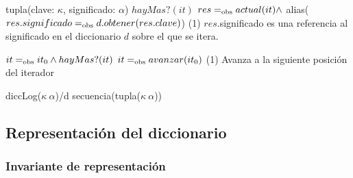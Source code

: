 {   }
{tupla(clave: $\kappa$, significado: $\alpha$)}
{$hayMas?(it)$}
{$res =_{\mathrm{obs}} actual(it) \land$ alias($res.significado =_{\mathrm{obs}} d.obtener(res.clave)$)}
{\bigo(1)}
{$res$.significado es una referencia al significado en el
    diccionario $d$ sobre el que se itera.}
{}

{   }
{}
{$it =_{\mathrm{obs}} it_0 \land hayMas?(it)$}
{$it =_{\mathrm{obs}} avanzar(it_0)$}
{\bigo(1)}
{}
{Avanza a la siguiente posición del iterador}



{diccLog($\kappa\ \alpha$)/d}
{secuencia(tupla($\kappa\ \alpha$))}
{}


\subsection{Representación del diccionario}



\subsubsection{Invariante de representación}

